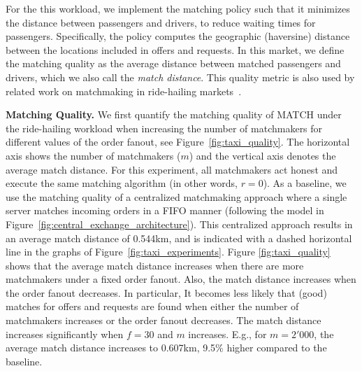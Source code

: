 For the this workload, we implement the matching policy such that it minimizes the distance between passengers and drivers, to reduce waiting times for passengers.
Specifically, the policy computes the geographic (haversine) distance between the locations included in offers and requests.
In this market, we define the matching quality as the average distance between matched passengers and drivers, which we also call the \emph{match distance}.
This quality metric is also used by related work on matchmaking in ride-hailing markets~\cite{pham2017oride}.

\textbf{Matching Quality.}
We first quantify the matching quality of MATCH under the ride-hailing workload when increasing the number of matchmakers for different values of the order fanout, see Figure~\ref{fig:taxi_quality}.
The horizontal axis shows the number of matchmakers ($ m $) and the vertical axis denotes the average match distance.
For this experiment, all matchmakers act honest and execute the same matching algorithm (in other words, $ r = 0 $).
As a baseline, we use the matching quality of a centralized matchmaking approach where a single server matches incoming orders in a FIFO manner (following the model in Figure~\ref{fig:central_exchange_architecture}).
This centralized approach results in an average match distance of 0.544km, and is indicated with a dashed horizontal line in the graphs of Figure~\ref{fig:taxi_experiments}.
Figure \ref{fig:taxi_quality} shows that the average match distance increases when there are more matchmakers under a fixed order fanout.
Also, the match distance increases when the order fanout decreases.
In particular, It becomes less likely that (good) matches for offers and requests are found when either the number of matchmakers increases or the order fanout decreases.
The match distance increases significantly when $ f = 30 $ and $ m $ increases. E.g., for $ m = 2'000 $, the average match distance increases to 0.607km, 9.5\% higher compared to the baseline.

